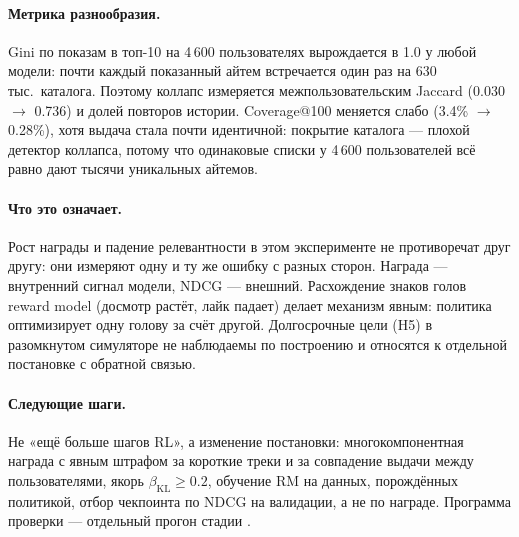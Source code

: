 \paragraph{Метрика разнообразия.} Gini по показам в топ-10 на 4\,600
пользователях вырождается в 1.0 у любой модели: почти каждый показанный
айтем встречается один раз на 630 тыс.\ каталога. Поэтому коллапс
измеряется межпользовательским Jaccard (0.030 $\to$ 0.736) и долей повторов
истории. Coverage@100 меняется слабо (3.4\% $\to$ 0.28\%), хотя выдача стала
почти идентичной: покрытие каталога --- плохой детектор коллапса, потому
что одинаковые списки у 4\,600 пользователей всё равно дают тысячи
уникальных айтемов.

\paragraph{Что это означает.} Рост награды и падение релевантности в этом
эксперименте не противоречат друг другу: они измеряют одну и ту же ошибку
с разных сторон. Награда --- внутренний сигнал модели, NDCG --- внешний.
Расхождение знаков голов reward model (досмотр растёт, лайк падает) делает
механизм явным: политика оптимизирует одну голову за счёт другой.
Долгосрочные цели (H5) в разомкнутом симуляторе не наблюдаемы по
построению и относятся к отдельной постановке с обратной связью.

\paragraph{Следующие шаги.} Не «ещё больше шагов RL», а изменение постановки:
многокомпонентная награда с явным штрафом за короткие треки и за совпадение
выдачи между пользователями, якорь $\beta_{\text{KL}} \ge 0.2$, обучение RM
на данных, порождённых политикой, отбор чекпоинта по NDCG на валидации, а
не по награде. Программа проверки --- отдельный прогон стадии
.
